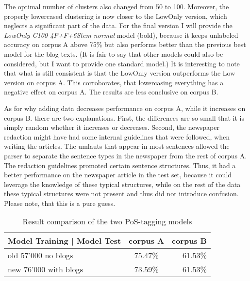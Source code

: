 \documentclass[11pt,letterpaper, covington]{article}
\begin{document}
The optimal number of clusters also changed from 50 to 100. Moreover, the properly lowercased clustering is now closer to the LowOnly version, which neglects a significant part of the data. For the final version I will provide the \emph{LowOnly C100 4P+F+6Stem normal} model (bold), because it keeps unlabeled accuracy on corpus A above 75\% but also performs better than the previous best model for the blog texts. (It is fair to say that other models could also be considered, but I want to provide one standard model.) It is interesting to note that what is still consistent is that the LowOnly version outperforms the Low version on corpus A. This corroborates, that lowercasing everything has a negative effect on corpus A. The results are less conclusive on corpus B.


As for why adding data decreases performance on corpus A, while it increases on corpus B. there are two explanations. First, the differences are so small that it is simply random whether it increases or decreases. Second, the newspaper redaction might have had some internal guidelines that were followed, when writing the articles. The umlauts that appear in most sentences allowed the parser to separate the sentence types in the newspaper from the rest of corpus A. The redaction guidelines promoted certain sentence structures. Thus, it had a better performance on the newspaper article in the test set, because it could leverage the knowledge of these typical structures, while on the rest of the data these typical structures were not present and thus did not introduce confusion. Please note, that this is a pure guess.

\begin{table}
\center
  \begin{tabular}{ | l || c | r | }
    \hline
   \textbf{Model Training | Model Test} & \textbf{corpus A} & \textbf{corpus B}  \\ \hline 
old 57'000 no blogs& 75.47\% & 61.53\% \\
new 76'000 with blogs & 73.59\% & 61.53\% \\ \hline
  \end{tabular}
\caption{Result comparison of the two PoS-tagging models}
\label{tab:pos}
\end{table}
 
\end{document}
